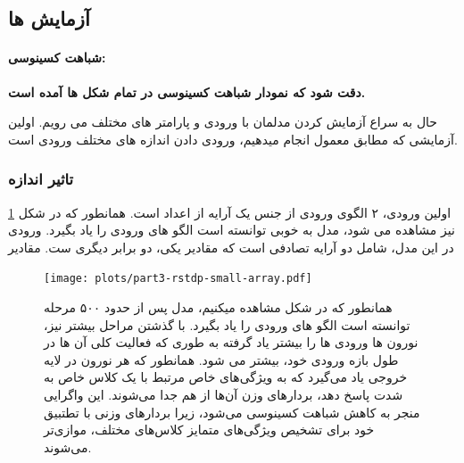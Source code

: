     \subsection{آزمایش ها}
        \paragraph*{شباهت کسینوسی:}
                \textbf{ دقت شود که نمودار شباهت کسینوسی در تمام شکل ها آمده است.}

        حال به سراع آزمایش کردن مدلمان با ورودی و پارامتر های مختلف می رویم. اولین آزمایشی که مطابق معمول انجام میدهیم، ورودی دادن اندازه های مختلف ورودی است.
        \subsubsection*{تاثیر اندازه}
        اولین ورودی، ۲ الگوی ورودی از جنس یک آرایه از اعداد است. همانطور که در شکل 
        \ref{fig:part3-rstdp-small-array}
        نیز مشاهده می شود، مدل به خوبی توانسته است الگو های ورودی را یاد بگیرد.
        ورودی در این مدل، شامل دو آرایه تصادفی است که مقادیر یکی، دو برابر دیگری ست. مقادیر 
        \begin{figure}[!ht]
            \centering
            \captionsetup{width=.9\linewidth}
            \texttt{[image: plots/part3-rstdp-small-array.pdf]} 
            \caption{همانطور که در شکل مشاهده میکنیم، مدل پس از حدود ۵۰۰ مرحله توانسته است الگو های ورودی را یاد بگیرد. با گذشتن مراحل بیشتر نیز، نورون ها ورودی ها را بیشتر یاد گرفته به طوری که فعالیت کلی آن ها در طول بازه ورودی خود، بیشتر می شود. 
            همانطور که هر نورون در لایه خروجی یاد می‌گیرد که به ویژگی‌های خاص مرتبط با یک کلاس خاص به شدت پاسخ دهد، بردارهای وزن آن‌ها از هم جدا می‌شوند. این واگرایی منجر به کاهش شباهت کسینوسی می‌شود، زیرا بردارهای وزنی با تطتبیق خود برای تشخیص ویژگی‌های متمایز کلاس‌های مختلف، موازی‌تر می‌شوند. }
            \label{fig:part3-rstdp-small-array}
        \end{figure}
        
